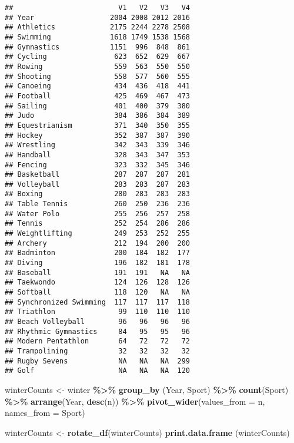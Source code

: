 \documentclass[
]{article}
\newenvironment{Shaded}{\begin{snugshade}}{\end{snugshade}}
\newcommand{\AttributeTok}[1]{\textcolor[rgb]{0.13,0.29,0.53}{#1}}
\newcommand{\FunctionTok}[1]{\textcolor[rgb]{0.13,0.29,0.53}{\textbf{#1}}}
\newcommand{\NormalTok}[1]{#1}
\newcommand{\OtherTok}[1]{\textcolor[rgb]{0.56,0.35,0.01}{#1}}
\newcommand{\SpecialCharTok}[1]{\textcolor[rgb]{0.81,0.36,0.00}{\textbf{#1}}}
\begin{document}
\begin{verbatim}
##                         V1   V2   V3   V4
## Year                  2004 2008 2012 2016
## Athletics             2175 2244 2278 2508
## Swimming              1618 1749 1538 1568
## Gymnastics            1151  996  848  861
## Cycling                623  652  629  667
## Rowing                 559  563  550  550
## Shooting               558  577  560  555
## Canoeing               434  436  418  441
## Football               425  469  467  473
## Sailing                401  400  379  380
## Judo                   384  386  384  389
## Equestrianism          371  340  350  355
## Hockey                 352  387  387  390
## Wrestling              342  343  339  346
## Handball               328  343  347  353
## Fencing                323  332  345  346
## Basketball             287  287  287  281
## Volleyball             283  283  287  283
## Boxing                 280  283  283  283
## Table Tennis           260  250  236  236
## Water Polo             255  256  257  258
## Tennis                 252  254  286  286
## Weightlifting          249  253  252  255
## Archery                212  194  200  200
## Badminton              200  184  182  177
## Diving                 196  182  181  178
## Baseball               191  191   NA   NA
## Taekwondo              124  126  128  126
## Softball               118  120   NA   NA
## Synchronized Swimming  117  117  117  118
## Triathlon               99  110  110  110
## Beach Volleyball        96   96   96   96
## Rhythmic Gymnastics     84   95   95   96
## Modern Pentathlon       64   72   72   72
## Trampolining            32   32   32   32
## Rugby Sevens            NA   NA   NA  299
## Golf                    NA   NA   NA  120
\end{verbatim}

\begin{Shaded}
\begin{Highlighting}[]
\NormalTok{winterCounts }\OtherTok{\textless{}{-}}\NormalTok{ winter }\SpecialCharTok{\%\textgreater{}\%} 
  \FunctionTok{group\_by}\NormalTok{ (Year, Sport) }\SpecialCharTok{\%\textgreater{}\%}
  \FunctionTok{count}\NormalTok{(Sport) }\SpecialCharTok{\%\textgreater{}\%} 
  \FunctionTok{arrange}\NormalTok{(Year, }\FunctionTok{desc}\NormalTok{(n)) }\SpecialCharTok{\%\textgreater{}\%}
  \FunctionTok{pivot\_wider}\NormalTok{(}\AttributeTok{values\_from =}\NormalTok{ n, }\AttributeTok{names\_from =}\NormalTok{ Sport)}

\NormalTok{winterCounts }\OtherTok{\textless{}{-}} \FunctionTok{rotate\_df}\NormalTok{(winterCounts)}
\FunctionTok{print.data.frame}\NormalTok{ (winterCounts)}
\end{Highlighting}
\end{Shaded}
\end{document}

